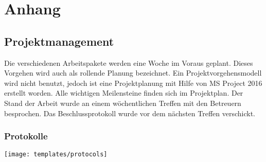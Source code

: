%
%


\chapter{Anhang}

  \section{Projektmanagement}

    Die verschiedenen Arbeitspakete werden eine Woche im Voraus geplant.
    Dieses Vorgehen wird auch als rollende Planung bezeichnet.
    Ein Projektvorgehensmodell wird nicht benutzt,
    jedoch ist eine Projektplanung mit Hilfe von MS Project 2016 erstellt worden.
    Alle wichtigen Meilensteine finden sich im Projektplan.
    Der Stand der Arbeit wurde an einem wöchentlichen Treffen mit den Betreuern besprochen.
    Das Beschlussprotokoll wurde vor dem nächsten Treffen verschickt.

    \begin{landscape}
      
      
      
    \end{landscape}

    \subsection{Protokolle}

      \texttt{[image: templates/protocols]}
      
